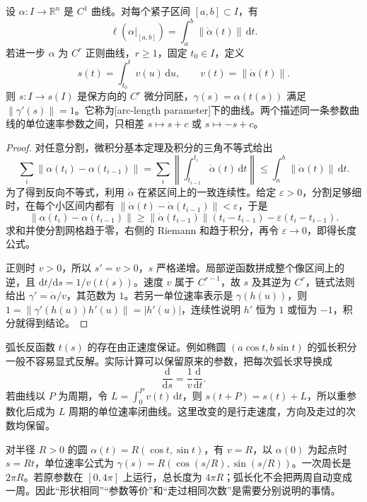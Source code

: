 \begin{proposition}\label{g1:prop:arc-length-param}
	设 \(\alpha:I\to\mathbb R^n\) 是 \(C^1\) 曲线。对每个紧子区间 \([a,b]\subset I\)，有
	\[
		\ell(\alpha|_{[a,b]})=\int_a^b\lVert\dot\alpha(t)\rVert\,\mathrm dt.
	\]
	若进一步 \(\alpha\) 为 \(C^r\) 正则曲线，\(r\ge1\)，固定 \(t_0\in I\)，定义
	\[
		s(t)=\int_{t_0}^t v(u)\,\mathrm du,\qquad v(t)=\lVert\dot\alpha(t)\rVert.
	\]
	则 \(s:I\to s(I)\) 是保方向的 \(C^r\) 微分同胚，\(\gamma(s)=\alpha(t(s))\) 满足 \(\lVert\gamma'(s)\rVert=1\)。它称为[arc-length parameter]下的曲线。两个描述同一条参数曲线的单位速率参数之间，只相差 \(s\mapsto s+c\) 或 \(s\mapsto -s+c\)。
\end{proposition}
\begin{proof}
	对任意分割，微积分基本定理及积分的三角不等式给出
	\[
		\sum_i\lVert\alpha(t_i)-\alpha(t_{i-1})\rVert
		=\sum_i\left\lVert\int_{t_{i-1}}^{t_i}\dot\alpha(t)\,\mathrm dt\right\rVert
		\le\int_a^b\lVert\dot\alpha(t)\rVert\,\mathrm dt.
	\]
	为了得到反向不等式，利用 \(\dot\alpha\) 在紧区间上的一致连续性。给定 \(\varepsilon>0\)，分割足够细时，在每个小区间内都有 \(\lVert\dot\alpha(t)-\dot\alpha(t_{i-1})\rVert<\varepsilon\)，于是
	\[
		\lVert\alpha(t_i)-\alpha(t_{i-1})\rVert
		\ge\lVert\dot\alpha(t_{i-1})\rVert(t_i-t_{i-1})-\varepsilon(t_i-t_{i-1}).
	\]
	求和并使分割网格趋于零，右侧的 Riemann 和趋于积分，再令 \(\varepsilon\to0\)，即得长度公式。

	正则时 \(v>0\)，所以 \(s'=v>0\)，\(s\) 严格递增。局部逆函数拼成整个像区间上的逆，且 \(\mathrm dt/\mathrm ds=1/v(t(s))\)。速度 \(v\) 属于 \(C^{r-1}\)，故 \(s\) 及其逆为 \(C^r\)，链式法则给出 \(\gamma'=\dot\alpha/v\)，其范数为 \(1\)。若另一单位速率表示是 \(\gamma(h(u))\)，则 \(1=\lVert\gamma'(h(u))h'(u)\rVert=|h'(u)|\)，连续性说明 \(h'\) 恒为 \(1\) 或恒为 \(-1\)，积分就得到结论。
\end{proof}

弧长反函数 \(t(s)\) 的存在由正速度保证。例如椭圆 \((a\cos t,b\sin t)\) 的弧长积分一般不容易显式反解。实际计算可以保留原来的参数，把每次弧长求导换成
\[
	\frac{\mathrm d}{\mathrm ds}=\frac1v\frac{\mathrm d}{\mathrm dt}.
\]
若曲线以 \(P\) 为周期，令 \(L=\int_0^P v(t)\,\mathrm dt\)，则 \(s(t+P)=s(t)+L\)，所以重参数化后成为 \(L\) 周期的单位速率闭曲线。这里改变的是行走速度，方向及走过的次数均保留。

\begin{example}\label{g1:exm:circle-speed}
	对半径 \(R>0\) 的圆 \(\alpha(t)=R(\cos t,\sin t)\)，有 \(v=R\)，以 \(\alpha(0)\) 为起点时 \(s=Rt\)，单位速率公式为 \(\gamma(s)=R(\cos(s/R),\sin(s/R))\)。一次周长是 \(2\pi R\)。若原参数在 \([0,4\pi]\) 上运行，总长度为 \(4\pi R\)；弧长化不会把两周自动变成一周。因此“形状相同”“参数等价”和“走过相同次数”是需要分别说明的事情。
\end{example}

